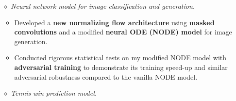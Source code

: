 \documentclass{simplecv}
\begin{document}
\begin{itemize}
  \item[$\diamond$] {\it Neural network model for image classification and generation.} %
  \begin{itemize}
    \item Developed a {\bf new normalizing flow architecture} using {\bf masked convolutions} and a modified {\bf neural ODE (NODE) model} for image generation.%
    \vspace{0.1em}
    \item Conducted rigorous statistical tests on my modified NODE model with {\bf adversarial training} to demonstrate its training speed-up and similar adversarial robustness compared to the vanilla NODE model.
  \end{itemize}
  \item[$\diamond$] {\it Tennis win prediction model.} %

\end{itemize}
\end{document}
